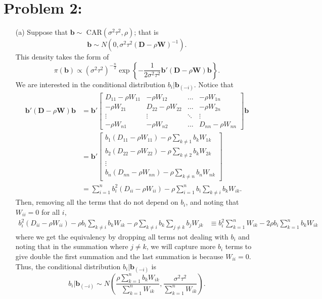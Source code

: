 \documentclass[11pt]{article}
\begin{document}
\newpage
\section*{Problem 2:}
\begin{itemize}
\item[(a)]  Suppose that $\mathbf{b} \sim$ CAR$(\sigma^2\tau^2,\rho)$; that is
\[
\mathbf{b}\sim N\left(0,\sigma^2\tau^2(\mathbf{D}-\rho\mathbf{W})^{-1}\right).
\]
This density takes the form of
\[
\pi(\mathbf{b}) \propto (\sigma^2\tau^2)^{-\frac{n}{2}}\exp\left\{-\frac{1}{2\sigma^2\tau^2}\mathbf{b}'(\mathbf{D}-\rho\mathbf{W})\mathbf{b}\right\}.
\]
We are interested in the conditional distribution $b_i|\mathbf{b}_{(-i)}$.  Notice that
\begin{align*}
\mathbf{b}'(\mathbf{D}-\rho\mathbf{W})\mathbf{b} &= \mathbf{b}'\begin{bmatrix}
D_{11}-\rho W_{11} & -\rho W_{12} & ... & -\rho W_{1n} \\
-\rho W_{21} & D_{22}-\rho W_{22} & ... & -\rho W_{2n} \\
\vdots & \vdots & \ddots &  \vdots \\
-\rho W_{n1} & -\rho W_{n2} &... & D_{nn} - \rho W_{nn}
\end{bmatrix}\mathbf{b} \\
&= \mathbf{b}' \begin{bmatrix}
b_1(D_{11}-\rho W_{11}) - \rho\sum_{k\not=1} b_kW_{1k} \\
b_2(D_{22} - \rho W_{22}) - \rho\sum_{k\not=2}b_k W_{2k} \\
\vdots \\
b_n(D_{nn} - \rho W_{nn}) - \rho\sum_{k\not=n}b_n W_{nk}
\end{bmatrix} \\
&= \sum_{i=1}^nb_i^2(D_{ii}-\rho W_{ii}) -\rho \sum_{i=1}^nb_i\sum_{k\not= i}b_kW_{ik}.
\end{align*}
Then, removing all the terms that do not depend on $b_i$, and noting that $W_{ii} = 0$ for all $i$,
\begin{align*}
b_i^2(D_{ii}-\rho W_{ii}) - \rho b_i\sum_{k\not=i}b_kW_{ik} - \rho\sum_{k\not= i}b_k\sum_{j\not=k} b_jW_{jk} &\equiv b_i^2 \sum_{k=1}^n W_{ik} - 2\rho b_i\sum_{k=1}^n b_k W_{ik}
\end{align*}
where we get the equivalency by dropping all terms not dealing with $b_i$ and noting that in the summation where $j\not=k$, we will capture more $b_i$ terms to give double the first summation and the last summation is because $W_{ii} = 0$.  Thus, the conditional distribution $b_i|\mathbf{b}_{(-i)}$ is
\[
b_i|\mathbf{b}_{(-i)} \sim N\left(\frac{\rho\sum_{k=1}^n b_k W_{ik}}{\sum_{k=1}^n W_{ik}},\frac{\sigma^2\tau^2}{\sum_{k=1}^n W_{ik}}\right).
\]


\end{itemize}
\end{document}
